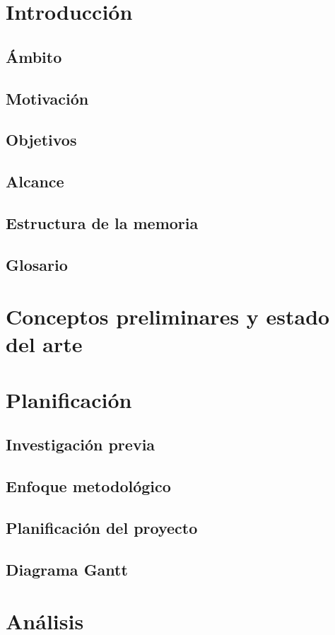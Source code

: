\documentclass[a4paper, 11pt, dvipsnames]{book}
\newcommand{\blankpage}
{
    \checkoddpage{}
    \ifoddpage{\newpage}{} \fi
    \cleardoublepage{}
    \thispagestyle{empty}
    \newpage
}
\begin{document}
    \blankpage

    \tableofcontents
    \chapter{Introducción}
    \section{Ámbito}
    \section{Motivación}
    \section{Objetivos}
    \section{Alcance}
    \section{Estructura de la memoria}
    \section{Glosario}
    \chapter{Conceptos preliminares y estado del arte}
    \chapter{Planificación}
    \section{Investigación previa}
    \section{Enfoque metodológico}
    \section{Planificación del proyecto}
    \section{Diagrama Gantt}
    \chapter{Análisis}
\end{document}
